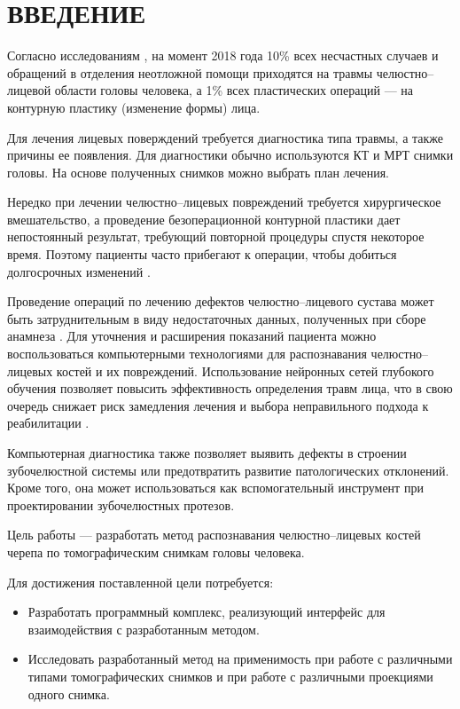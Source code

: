\section*{ВВЕДЕНИЕ}

Согласно исследованиям \cite{facialfracs0}\cite{isaps}, на момент 2018 года 10\% всех несчастных случаев и обращений в отделения неотложной помощи приходятся на травмы челюстно--лицевой области головы человека, а 1\% всех пластических операций --- на контурную пластику (изменение формы) лица.

Для лечения лицевых поверждений требуется диагностика типа травмы, а также причины ее появления. Для диагностики обычно используются КТ и МРТ снимки головы. На основе полученных снимков можно выбрать план лечения.

Нередко при лечении челюстно--лицевых повреждений требуется хирургическое вмешательство, а проведение безоперационной контурной пластики дает непостоянный результат, требующий повторной процедуры спустя некоторое время. Поэтому пациенты часто прибегают к операции, чтобы добиться долгосрочных изменений \cite{isaps}.

Проведение операций по лечению дефектов челюстно--лицевого сустава может быть затруднительным в виду недостаточных данных, полученных при сборе анамнеза \cite{facialfracs1}. Для уточнения и расширения показаний пациента можно воспользоваться компьютерными технологиями для распознавания челюстно--лицевых костей и их повреждений. Использование нейронных сетей глубокого обучения позволяет повысить эффективность определения травм лица, что в свою очередь снижает риск замедления лечения и выбора неправильного подхода к реабилитации \cite{facialfracs2}.

Компьютерная диагностика также позволяет выявить дефекты в строении зубочелюстной системы или предотвратить развитие патологических отклонений. Кроме того, она может использоваться как вспомогательный инструмент при проектировании зубочелюстных протезов.

Цель работы --- разработать метод распознавания челюстно--лицевых костей черепа по томографическим снимкам головы человека.

Для достижения поставленной цели потребуется:
\begin{itemize}
\item Разработать программный комплекс, реализующий интерфейс для взаимодействия с разработанным методом.
\item Исследовать разработанный метод на применимость при работе с различными типами томографических снимков и при работе с различными проекциями одного снимка.
\end{itemize}